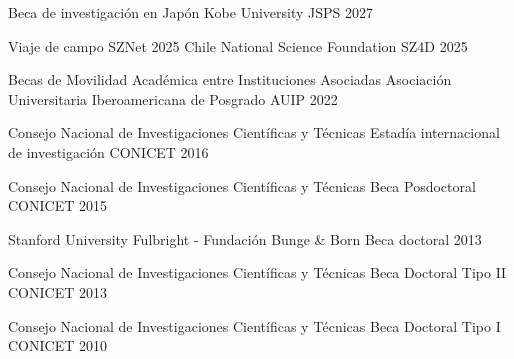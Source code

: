 



\begin{cvhonors}


\cvhonor
    {Beca de investigación en Japón} %
    {Kobe University} %
    {JSPS} %
    {2027} %

\cvhonor
    {Viaje de campo SZNet 2025 Chile} %
    {National Science Foundation} %
    {SZ4D} %
    {2025} %

\cvhonor
    {Becas de Movilidad Académica entre Instituciones Asociadas} %
    {Asociación Universitaria Iberoamericana de Posgrado} %
    {AUIP} %
    {2022} %
    

\cvhonor
    {Consejo Nacional de Investigaciones Científicas y Técnicas}
    {Estadía internacional de investigación}
    {CONICET}
    {2016}
    

\cvhonor
    {Consejo Nacional de Investigaciones Científicas y Técnicas}
    {Beca Posdoctoral}
    {CONICET}
    {2015}
    

\cvhonor
    {Stanford University}
    {Fulbright - Fundación Bunge \& Born}
    {Beca doctoral}
    {2013}
    

\cvhonor
   {Consejo Nacional de Investigaciones Científicas y Técnicas}
    {Beca Doctoral Tipo II}
    {CONICET}
    {2013}
    

\cvhonor
  {Consejo Nacional de Investigaciones Científicas y Técnicas}
    {Beca Doctoral Tipo I}
    {CONICET}
    {2010}
    




\end{cvhonors}
